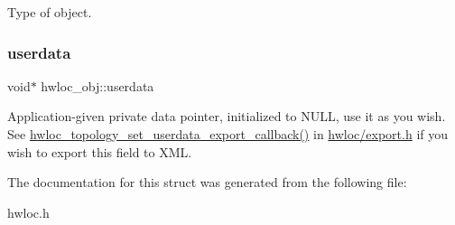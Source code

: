 Type of object. 

\mbox{\label{a00238_a76fd3ac94401cf32dfccc3a3a8de68a5}} 
\subsubsection{\texorpdfstring{userdata}{userdata}}
{\footnotesize\ttfamily void$\ast$ hwloc\+\_\+obj\+::userdata}



Application-\/given private data pointer, initialized to {\ttfamily N\+U\+LL}, use it as you wish. See \hyperlink{a00206_ga9d6ff0f7a8dd45be9aa8575ef31978cc}{hwloc\+\_\+topology\+\_\+set\+\_\+userdata\+\_\+export\+\_\+callback()} in \hyperlink{a00128_source}{hwloc/export.\+h} if you wish to export this field to X\+ML. 



The documentation for this struct was generated from the following file\+:\begin{DoxyCompactItemize}
\item 
hwloc.\+h\end{DoxyCompactItemize}
